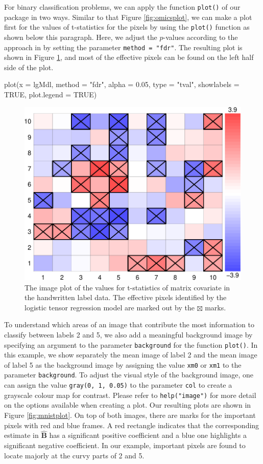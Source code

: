 For binary classification problems, we can apply the function
\texttt{plot()} of our package  in two ways.
Similar to that Figure \ref{fig:omicsplot}, we can make a plot first for
the values of t-statistics for the pixels by using the \texttt{plot()}
function as shown below this paragraph. Here, we adjust the \(p\)-values
according to the approach in \cite{benjamini1995controlling} by setting
the parameter \texttt{method\ =\ "fdr"}. The resulting plot is shown in
Figure \ref{fig:mnisttval}, and most of the effective pixels can be
found on the left half side of the plot.

\begin{Schunk}
\begin{Sinput}
plot(x = lgMdl, method = "fdr", alpha = 0.05, type = "tval", 
     showlabels = TRUE, plot.legend = TRUE) 
\end{Sinput}
\begin{figure}

{\centering \includegraphics[width=0.45\linewidth]{chen-chang-chen-tzeng-chang_files/figure-latex/mnisttval-1} 

}

\caption[The image plot of the values for t-statistics of matrix covariate in the handwritten label data]{The image plot of the values for t-statistics of matrix covariate in the handwritten label data.  The effective pixels identified by the logistic tensor regression model are marked out by the $\boxtimes$ marks.}\label{fig:mnisttval}
\end{figure}
\end{Schunk}

To understand which areas of an image that contribute the most
information to classify between labels 2 and 5, we also add a meaningful
background image by specifying an argument to the parameter
\texttt{background} for the function \texttt{plot()}. In this example,
we show separately the mean image of label 2 and the mean image of label
5 as the background image by assigning the value \texttt{xm0} or
\texttt{xm1} to the parameter \texttt{background}. To adjust the visual
style of the background image, one can assign the value
\texttt{gray(0,\ 1,\ 0.05)} to the parameter \texttt{col} to create a
grayscale colour map for contrast. Please refer to
\texttt{help("image")} for more detail on the options available when
creating a plot. Our resulting plots are shown in Figure
\ref{fig:mnistplot}. On top of both images, there are marks for the
important pixels with red and blue frames. A red rectangle indicates
that the corresponding estimate in \(\hat{\mathbf B}\) has a significant
positive coefficient and a blue one highlights a significant negative
coefficient. In our example, important pixels are found to locate
majorly at the curvy parts of 2 and 5.


